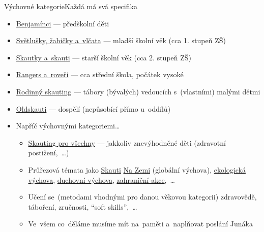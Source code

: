 \documentclass[compress, ucs, xelatex, 11pt, xcolor=dvipsnames, print, aspectratio=169,
	hyperref={
		bookmarks=true,
		unicode=true,
		colorlinks=true,
		pdftitle={Skautska vychovna metoda},
		plainpages=false,
		pdfauthor={Vojtech Zeisek},
		pdfsubject={Skautska vychovna metoda a jeji vyvoj za posledni stoleti a desetileti},
		pdfcreator={XeLaTeX},
		pdfkeywords={Junak, Pedagogika, Skaut, Skauting, Vychovna metoda},
		linkcolor=Red, %
		anchorcolor=ForestGreen, %
		citecolor=ForestGreen, %
		filecolor=ForestGreen, %
		menucolor=ForestGreen, %
		urlcolor=Sepia, %
		pdftex},
	url={hyphens, lowtilde} %
	]{beamer}
\begin{document}
\begin{frame}{Výchovné kategorie}{Každá má svá specifika}
	\begin{itemize}
		\item \href{https://krizovatka.skaut.cz/benjaminci}{Benjamínci} --- předškolní děti
		\item \href{https://krizovatka.skaut.cz/svetlusky-zabicky-vlcata}{Světlušky, žabičky a~vlčata} --- mladší školní věk (cca 1. stupeň ZŠ)
		\item \href{https://krizovatka.skaut.cz/skautky-skauti}{Skautky a~skauti} --- starší školní věk (cca 2. stupeň ZŠ)
		\item \href{https://krizovatka.skaut.cz/roveri-rangers}{Rangers a~roveři} --- cca střední škola, počátek vysoké
		\item \href{https://krizovatka.skaut.cz/kmen-dospelych-a-rodinny-skauting/rodinny-skauting}{Rodinný skauting} --- tábory (bývalých) vedoucích s~(vlastními) malými dětmi
		\item \href{https://krizovatka.skaut.cz/kmen-dospelych-a-rodinny-skauting/kmen-dospelych}{Oldskauti} --- dospělí (nepůsobící přímo u~oddílů)
		\item Napříč výchovnými kategoriemi\ldots
		\begin{itemize}
			\item \href{https://krizovatka.skaut.cz/organizace/ustredni-organy/odbory-vykonne-rady/skauting-pro-vsechny}{Skauting pro všechny} --- jakkoliv znevýhodněné děti (zdravotní postižení,~\ldots)
			\item Průřezová témata jako \href{https://krizovatka.skaut.cz/organizace/ustredni-organy/odbory-vykonne-rady/skauti-na-zemi}{Skauti} \href{https://www.skautinazemi.cz/}{Na Zemi} (globální výchova), \href{https://krizovatka.skaut.cz/organizace/ustredni-organy/odbory-vykonne-rady/ekologicky-odbor}{ekologická výchova}, \href{https://krizovatka.skaut.cz/organizace/ustredni-organy/odbory-vykonne-rady/odbor-duchovni-vychovy}{duchovní výchova}, \href{https://krizovatka.skaut.cz/mezinarodni-skauting/zahranicni-odbor-and-international-tym}{zahraniční akce},~\ldots
			\item Učení se~(metodami vhodnými pro danou věkovou kategorii) zdravovědě, táboření, zručnosti, \enquote{soft skills},~\ldots
			\item Ve~všem co~děláme musíme mít na~paměti a~naplňovat poslání Junáka
		\end{itemize}
	\end{itemize}
\end{frame}
\end{document}
